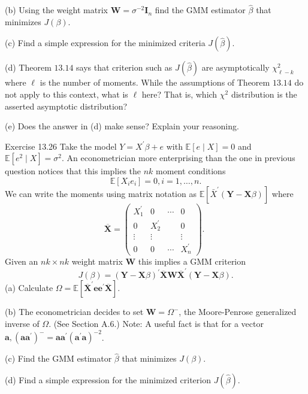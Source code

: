 \documentclass[10pt]{article}
\begin{document}
(b) Using the weight matrix $\boldsymbol{W}=\sigma^{-2} \boldsymbol{I}_{n}$ find the GMM estimator $\widehat{\beta}$ that minimizes $J(\beta)$.

(c) Find a simple expression for the minimized criteria $J(\widehat{\beta})$.

(d) Theorem $13.14$ says that criterion such as $J(\widehat{\beta})$ are asymptotically $\chi_{\ell-k}^{2}$ where $\ell$ is the number of moments. While the assumptions of Theorem $13.14$ do not apply to this context, what is $\ell$ here? That is, which $\chi^{2}$ distribution is the asserted asymptotic distribution?

(e) Does the answer in (d) make sense? Explain your reasoning.

Exercise 13.26 Take the model $Y=X^{\prime} \beta+e$ with $\mathbb{E}[e \mid X]=0$ and $\mathbb{E}\left[e^{2} \mid X\right]=\sigma^{2}$. An econometrician more enterprising than the one in previous question notices that this implies the $n k$ moment conditions
$$
\mathbb{E}\left[X_{i} e_{i}\right]=0, i=1, \ldots, n .
$$
We can write the moments using matrix notation as $\mathbb{E}\left[\bar{X}^{\prime}(\boldsymbol{Y}-\boldsymbol{X} \beta)\right]$ where
$$
\overline{\boldsymbol{X}}=\left(\begin{array}{cccc}
X_{1}^{\prime} & 0 & \cdots & 0 \\
0 & X_{2}^{\prime} & & 0 \\
\vdots & \vdots & & \vdots \\
0 & 0 & \cdots & X_{n}^{\prime}
\end{array}\right) \text {. }
$$
Given an $n k \times n k$ weight matrix $\boldsymbol{W}$ this implies a GMM criterion
$$
J(\beta)=(\boldsymbol{Y}-\boldsymbol{X} \beta)^{\prime} \overline{\boldsymbol{X}} \boldsymbol{W} \overline{\boldsymbol{X}}^{\prime}(\boldsymbol{Y}-\boldsymbol{X} \beta) .
$$
(a) Calculate $\Omega=\mathbb{E}\left[\overline{\boldsymbol{X}}^{\prime} \boldsymbol{e} \boldsymbol{e}^{\prime} \overline{\boldsymbol{X}}\right]$.

(b) The econometrician decides to set $\boldsymbol{W}=\Omega^{-}$, the Moore-Penrose generalized inverse of $\Omega$. (See Section A.6.) Note: A useful fact is that for a vector $\boldsymbol{a},\left(\boldsymbol{a} \boldsymbol{a}^{\prime}\right)^{-}=\boldsymbol{a} \boldsymbol{a}^{\prime}\left(\boldsymbol{a}^{\prime} \boldsymbol{a}\right)^{-2}$.

(c) Find the GMM estimator $\widehat{\beta}$ that minimizes $J(\beta)$.

(d) Find a simple expression for the minimized criterion $J(\widehat{\beta})$.
\end{document}
